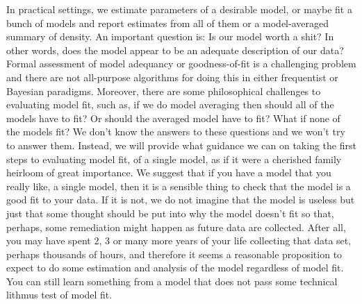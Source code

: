 In practical settings, we estimate parameters of a desirable model, or
maybe fit a bunch of models and report estimates from all of them or a
model-averaged summary of density.  An important question is: Is our
model worth a shit?  In other words, does the model appear to be an
adequate description of our data?
Formal
assessment of model adequancy or goodness-of-fit is a challenging
problem and there are not all-purpose algorithms for doing this in
either frequentist or Bayesian paradigms. Moreover, there are some
philosophical challenges to evaluating model fit, such as, if we do
model averaging then should all of the models have to fit? Or should
the averaged model have to fit? What if none of the models fit?
We don't know the answers to these questions and we
won't try to answer them. Instead, we will provide what guidance we
can on taking the first steps to evaluating model fit, of a single
model, as if it were a cherished family heirloom of great
importance.  We suggest that if you have a model that you really like,
a single model, then it is a sensible thing to check that the model is
a good fit to your data. If it is not, we do not imagine that the
model is useless but just that some thought should be put into why the
model doesn't fit so that, perhaps, some remediation might happen as
future data are collected. After all, you may have spent 2, 3 or many
more years of your life collecting that data set, perhaps thousands of
hours, and therefore it seems a reasonable proposition to expect to do
some estimation and analysis of the model regardless of model fit. You
can still learn something from a model that does not pass some
technical lithmus test of model fit.

